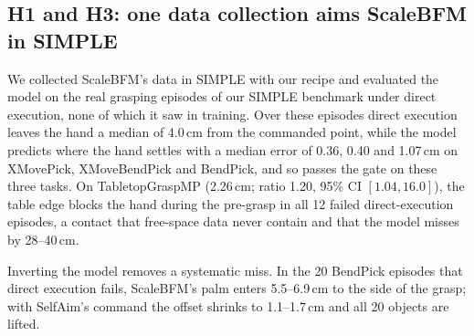 \documentclass[conference]{IEEEtran}
\begin{document}
\subsection{H1 and H3: one data collection aims ScaleBFM in SIMPLE}
We collected ScaleBFM's data in SIMPLE with our recipe and evaluated the model on the real grasping episodes of our SIMPLE benchmark under direct execution, none of which it saw in training. Over these episodes direct execution leaves the hand a median of 4.0\,cm from the commanded point, while the model predicts where the hand settles with a median error of 0.36, 0.40 and 1.07\,cm on XMovePick, XMoveBendPick and BendPick, and so passes the gate on these three tasks. On TabletopGraspMP (2.26\,cm; ratio 1.20, 95\% CI $[1.04,16.0]$), the table edge blocks the hand during the pre-grasp in all 12 failed direct-execution episodes, a contact that free-space data never contain and that the model misses by 28--40\,cm.

Inverting the model removes a systematic miss. In the 20 BendPick episodes that direct execution fails, ScaleBFM's palm enters 5.5--6.9\,cm to the side of the grasp; with SelfAim's command the offset shrinks to 1.1--1.7\,cm and all 20 objects are lifted.
\end{document}
